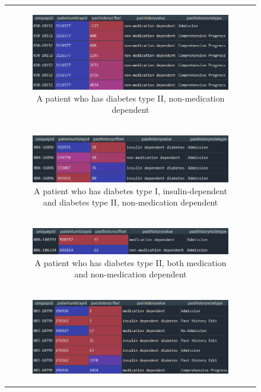 \begin{figure}[H]
\begin{tabular}{@{}c@{}}
\begin{subfigure}{1\textwidth}
  \centering
  \includegraphics[width=15cm]{fig/chapter3/pasthistory_m1.png}
  \caption{\footnotesize{A patient who has diabetes type II, non-medication dependent}}
  \label{fig:pasthisotory1}
\end{subfigure} \\
\begin{subfigure}{1\textwidth}
  \centering
  \includegraphics[width=15cm]{fig/chapter3/pasthistory_m2.png}
  \caption{\footnotesize{A patient who has diabetes type I, insulin-dependent and diabetes type II, non-medication dependent}}
  \label{fig:pasthisotory2}
\end{subfigure} \\
\begin{subfigure}{1\textwidth}
  \centering
  \includegraphics[width=15cm]{fig/chapter3/pasthistory_m3.png}
  \caption{\footnotesize{A patient who has diabetes type II, both medication and non-medication dependent}}
  \label{fig:pasthisotory3}
\end{subfigure} \\
\begin{subfigure}{1\textwidth}
  \centering
  \includegraphics[width=15cm]{fig/chapter3/pasthistory_m4.png}

\end{subfigure}
\end{tabular}
\end{figure}
